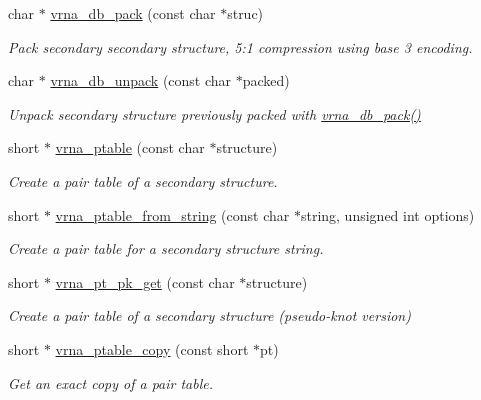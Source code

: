 \begin{DoxyCompactItemize}
char $\ast$ \mbox{\hyperlink{group__struct__utils_ga55c4783060a1464f862f858d5599c9e1}{vrna\+\_\+db\+\_\+pack}} (const char $\ast$struc)
\begin{DoxyCompactList}\small\item\em Pack secondary secondary structure, 5\+:1 compression using base 3 encoding. \end{DoxyCompactList}\item 
char $\ast$ \mbox{\hyperlink{group__struct__utils_ga6490adff857d84ce06e6f379ae3a4512}{vrna\+\_\+db\+\_\+unpack}} (const char $\ast$packed)
\begin{DoxyCompactList}\small\item\em Unpack secondary structure previously packed with \mbox{\hyperlink{group__struct__utils_ga55c4783060a1464f862f858d5599c9e1}{vrna\+\_\+db\+\_\+pack()}} \end{DoxyCompactList}\item 
short $\ast$ \mbox{\hyperlink{group__struct__utils_gae829fb8bb7f694c12a9c0bbc34c77c60}{vrna\+\_\+ptable}} (const char $\ast$structure)
\begin{DoxyCompactList}\small\item\em Create a pair table of a secondary structure. \end{DoxyCompactList}\item 
short $\ast$ \mbox{\hyperlink{group__struct__utils_gac76c9ef3de507748fb0416a59323362b}{vrna\+\_\+ptable\+\_\+from\+\_\+string}} (const char $\ast$string, unsigned int options)
\begin{DoxyCompactList}\small\item\em Create a pair table for a secondary structure string. \end{DoxyCompactList}\item 
short $\ast$ \mbox{\hyperlink{group__struct__utils_gacca520048b24ec5a8978f4dafb4e4bf8}{vrna\+\_\+pt\+\_\+pk\+\_\+get}} (const char $\ast$structure)
\begin{DoxyCompactList}\small\item\em Create a pair table of a secondary structure (pseudo-\/knot version) \end{DoxyCompactList}\item 
short $\ast$ \mbox{\hyperlink{group__struct__utils_ga2daefbbd6d9f8803731651882f54332d}{vrna\+\_\+ptable\+\_\+copy}} (const short $\ast$pt)
\begin{DoxyCompactList}\small\item\em Get an exact copy of a pair table. \end{DoxyCompactList}\item 

\end{DoxyCompactItemize}
